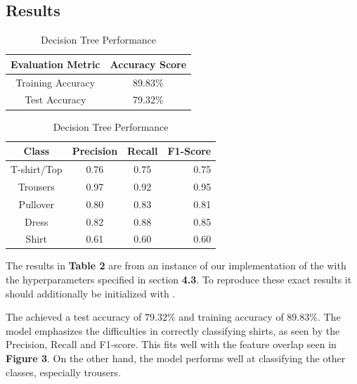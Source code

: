 \subsection{Results}\label{subsec:results}
\begin{table}[!ht]
\begin{subtable}[c]{0.4\textwidth}
\footnotesize
\centering
\begin{tabular}{ c | c }
 \toprule
 Evaluation Metric & Accuracy Score  \\
 \midrule
 Training Accuracy &  89.83\% \\
 Test Accuracy &79.32\% \\
 \bottomrule
\end{tabular}
\captionsetup{justification=centering,margin=1cm}
\end{subtable}
\begin{subtable}[c]{0.6\textwidth}
\footnotesize
\centering
\begin{tabular}{c | c c r}
Class & Precision & Recall & F1-Score\\
\midrule
T-shirt/Top   &    0.76  &    0.75  &    0.75 \\
Trousers   &    0.97  &    0.92  &    0.95 \\
Pullover   &    0.80  &    0.83  &    0.81\\
Dress   &    0.82  &    0.88  &    0.85\\
Shirt   &    0.61  &    0.60  &    0.60\\
\end{tabular}
\captionsetup{justification=centering,margin=1cm}
\end{subtable}
\caption{Decision Tree Performance}
\label{tab:dt_evaluation}
\end{table}
\newline

The results in \textbf{Table 2} are from an instance of our implementation of the  with the hyperparameters specified in section \textbf{4.3}.
To reproduce these exact results it should additionally be initialized with .
\newline

The  achieved a test accuracy of $79.32\%$ and training accuracy of $89.83\%$.
The model emphasizes the difficulties in correctly classifying shirts, as seen by the Precision, Recall and F1-score.
This fits well with the feature overlap seen in \textbf{Figure 3}.
On the other hand, the model performs well at classifying the other classes, especially trousers.








